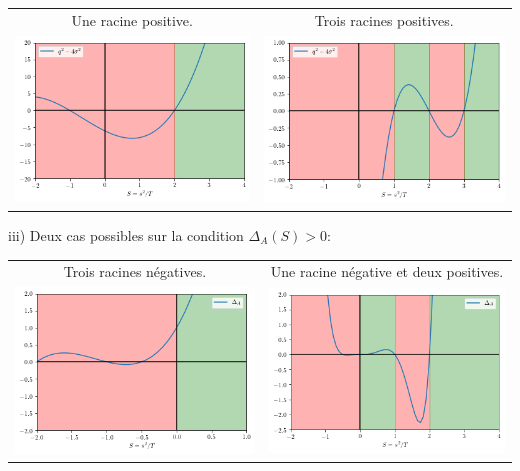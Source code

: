 \documentclass[11pt]{article}
\begin{document}
\begin{tabular}{cc}
Une racine positive. & Trois racines positives. \\
\includegraphics[width=.47\textwidth]{Images/q2cas1.png} & \includegraphics[width=.47\textwidth]{Images/q2cas2.png} \\
\end{tabular}
iii) Deux cas possibles sur la condition $\Delta_A(S) >0$:\\

\begin{tabular}{cc}
Trois racines négatives. & Une racine négative et deux positives.\\
\includegraphics[width=.47\textwidth]{Images/deltacas1.png} & \includegraphics[width=.47\textwidth]{Images/deltacas2.png} \\
\end{tabular}
\end{document}
